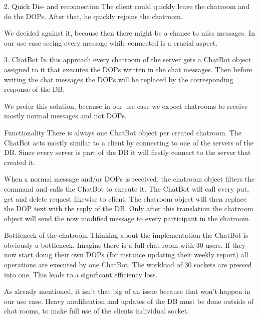 2.	Quick Dis- and reconnection
The client could quickly leave the chatroom and do the DOPs. After that, he quickly rejoins the chatroom.

We decided against it, because then there might be a chance to miss messages. In our use case seeing every message while connected is a crucial aspect.

3.	ChatBot
In this approach every chatroom of the server gets a ChatBot object assigned to it that executes the DOPs written in the chat messages. Then before writing the chat messages the DOPs will be replaced by the corresponding response of the DB. 

We prefer this solution, because in our use case we expect chatrooms to receive mostly normal messages and not DOPs. 

Functionality
There is always one ChatBot object per created chatroom. The ChatBot acts mostly similar to a client by connecting to one of the servers of the DB. Since every server is part of the DB it will firstly connect to the server that created it. 

When a normal message and/or DOPs is received, the chatroom object filters the command and calls the ChatBot to execute it. The ChatBot will call every put, get and delete request likewise to client. The chatroom object will then replace the DOP text with the reply of the DB. Only after this translation the chatroom object will send the now modified message to every participant in the chatroom.

Bottleneck of the chatroom
Thinking about the implementation the ChatBot is obviously a bottleneck. Imagine there is a full chat room with 30 users. If they now start doing their own DOPs (for instance updating their weekly report) all operations are executed by one ChatBot. The workload of 30 sockets are pressed into one. This leads to a significant efficiency loss.

As already mentioned, it isn’t that big of an issue because that won’t happen in our use case. Heavy modification and updates of the DB must be done outside of chat rooms, to make full use of the clients individual socket.




